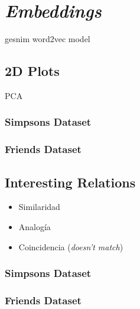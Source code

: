 \section{\textit{Embeddings}}

gesnim word2vec model

\subsection{2D Plots}

PCA

\subsubsection{Simpsons Dataset}

\subsubsection{Friends Dataset}

\subsection{Interesting Relations}
\begin{itemize}
    \item Similaridad
    
    \item Analogía 
    
    \item Coincidencia (\textit{doesn't match})
\end{itemize}
\subsubsection{Simpsons Dataset}

\subsubsection{Friends Dataset}